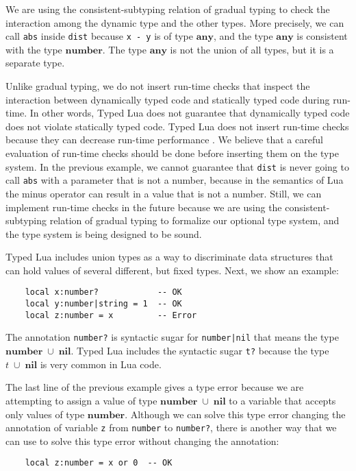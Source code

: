 \documentclass[preprint]{sig-alternate}
\newcommand{\Any}{\mathbf{any}}
\newcommand{\Nil}{\mathbf{nil}}
\newcommand{\Number}{\mathbf{number}}
\begin{document}
We are using the consistent-subtyping relation of gradual
typing to check the interaction among the dynamic type and the other
types.
More precisely, we can call \texttt{abs} inside \texttt{dist} because
\texttt{x - y} is of type $\Any$, and the type $\Any$ is
consistent with the type $\Number$.
The type $\Any$ is not the union of all types, but it is a separate
type.

Unlike gradual typing, we do not insert run-time checks that
inspect the interaction between dynamically typed code and statically
typed code during run-time.
In other words, Typed Lua does not guarantee that dynamically typed
code does not violate statically typed code.
Typed Lua does not insert run-time checks because they can decrease
run-time performance \citep{allende2013cis}.
We believe that a careful evaluation of run-time checks should be done
before inserting them on the type system.
In the previous example, we cannot guarantee that \texttt{dist} is never
going to call \texttt{abs} with a parameter that is not a number,
because in the semantics of Lua the minus operator can result in a
value that is not a number.
Still, we can implement run-time checks in the future because we are
using the consistent-subtyping relation of gradual typing to
formalize our optional type system, and the type system is being
designed to be sound.

Typed Lua includes union types as a way to discriminate data
structures that can hold values of several different, but fixed types.
Next, we show an example:
\begin{verbatim}
    local x:number?            -- OK
    local y:number|string = 1  -- OK
    local z:number = x         -- Error
\end{verbatim}

The annotation \texttt{number?} is syntactic sugar for
\texttt{number|nil} that means the type $\Number\;\cup\;\Nil$.
Typed Lua includes the syntactic sugar \texttt{t?} because the
type $t\;\cup\;\Nil$ is very common in Lua code.

The last line of the previous example gives a type error because we
are attempting to assign a value of type $\Number\;\cup\;\Nil$
to a variable that accepts only values of type $\Number$.
Although we can solve this type error changing the annotation of
variable \texttt{z} from \texttt{number} to \texttt{number?}, there is
another way that we can use to solve this type error without changing
the annotation:
\begin{verbatim}
    local z:number = x or 0  -- OK
\end{verbatim}
\end{document}
